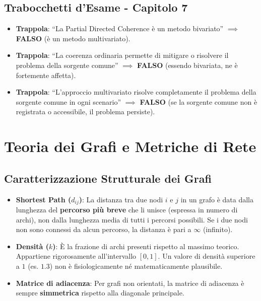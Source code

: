 \documentclass[10pt, letterpaper]{report}
\begin{document}
\section*{Trabocchetti d'Esame - Capitolo 7}
\begin{itemize}
    \item \textbf{Trappola}: ``La Partial Directed Coherence è un metodo bivariato'' \(\implies\) \textbf{FALSO} (è un metodo multivariato).
    \item \textbf{Trappola}: ``La coerenza ordinaria permette di mitigare o risolvere il problema della sorgente comune'' \(\implies\) \textbf{FALSO} (essendo bivariata, ne è fortemente affetta).
    \item \textbf{Trappola}: ``L'approccio multivariato risolve completamente il problema della sorgente comune in ogni scenario'' \(\implies\) \textbf{FALSO} (se la sorgente comune non è registrata o accessibile, il problema persiste).
\end{itemize}

\chapter{Teoria dei Grafi e Metriche di Rete}

\section{Caratterizzazione Strutturale dei Grafi}
\begin{itemize}
    \item \textbf{Shortest Path (\(d_{ij}\))}: La distanza tra due nodi \(i\) e \(j\) in un grafo è data dalla lunghezza del \textbf{percorso più breve} che li unisce (espressa in numero di archi), non dalla lunghezza media di tutti i percorsi possibili. Se i due nodi non sono connessi da alcun percorso, la distanza è pari a \(\infty\) (infinito).
    \item \textbf{Densità (\(k\))}: È la frazione di archi presenti rispetto al massimo teorico. Appartiene rigorosamente all'intervallo \([0, 1]\). Un valore di densità superiore a \(1\) (es. \(1.3\)) non è fisiologicamente né matematicamente plausibile.
    \item \textbf{Matrice di adiacenza}: Per grafi non orientati, la matrice di adiacenza è sempre \textbf{simmetrica} rispetto alla diagonale principale.
\end{itemize}
\end{document}
